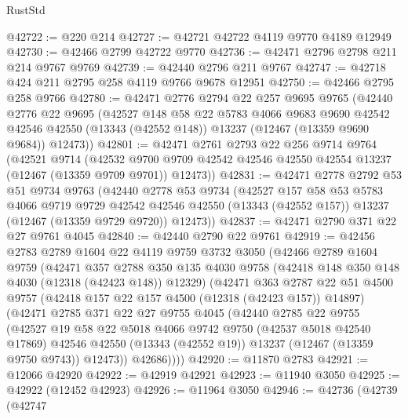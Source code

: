 \begin{lexlean}{RustStd}
\begin{coremodule}
@42722 := @220 @214
@42727 := @42721 @42722 @4119 @9770 @4189 @12949
@42730 := @42466 @2799 @42722 @9770
@42736 := @42471 @2796 @2798 @211 @214 @9767 @9769
@42739 := @42440 @2796 @211 @9767
@42747 := @42718 @424 @211 @2795 @258 @4119 @9766 @9678 @12951
@42750 := @42466 @2795 @258 @9766
@42780 := @42471
    @2776
    @2794
    @22
    @257
    @9695
    @9765
    (@42440
      @2776
      @22
      @9695
      (@42527
        @148
        @58
        @22
        @5783
        @4066
        @9683
        @9690
        @42542
        @42546
        @42550
        (@13343 (@42552 @148))
        @13237
        (@12467 (@13359 @9690 @9684))
        @12473))
@42801 := @42471
    @2761
    @2793
    @22
    @256
    @9714
    @9764
    (@42521
      @9714
      (@42532 @9700 @9709 @42542 @42546 @42550 @42554 @13237 (@12467 (@13359 @9709 @9701)) @12473))
@42831 := @42471
    @2778
    @2792
    @53
    @51
    @9734
    @9763
    (@42440
      @2778
      @53
      @9734
      (@42527
        @157
        @58
        @53
        @5783
        @4066
        @9719
        @9729
        @42542
        @42546
        @42550
        (@13343 (@42552 @157))
        @13237
        (@12467 (@13359 @9729 @9720))
        @12473))
@42837 := @42471 @2790 @371 @22 @27 @9761 @4045
@42840 := @42440 @2790 @22 @9761
@42919 := @42456
    @2783
    @2789
    @1604
    @22
    @4119
    @9759
    @3732
    @3050
    (@42466
      @2789
      @1604
      @9759
      (@42471
        @357
        @2788
        @350
        @135
        @4030
        @9758
        (@42418 @148 @350 @148 @4030 (@12318 (@42423 @148)) @12329)
        (@42471
          @363
          @2787
          @22
          @51
          @4500
          @9757
          (@42418 @157 @22 @157 @4500 (@12318 (@42423 @157)) @14897)
          (@42471
            @2785
            @371
            @22
            @27
            @9755
            @4045
            (@42440
              @2785
              @22
              @9755
              (@42527
                @19
                @58
                @22
                @5018
                @4066
                @9742
                @9750
                (@42537 @5018 @42540 @17869)
                @42546
                @42550
                (@13343 (@42552 @19))
                @13237
                (@12467 (@13359 @9750 @9743))
                @12473))
            @42686))))
@42920 := @11870 @2783
@42921 := @12066 @42920
@42922 := @42919 @42921
@42923 := @11940 @3050
@42925 := @42922 (@12452 @42923)
@42926 := @11964 @3050
@42946 := @42736
    (@42739
      (@42747

\end{coremodule}
\end{lexlean}
